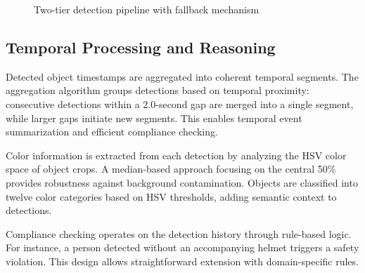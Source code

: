 \documentclass[12pt,a4paper]{article}
\begin{document}
\begin{figure}[H]
\centering
{}
\caption{Two-tier detection pipeline with fallback mechanism}
\label{fig:pipeline}
\end{figure}

\subsection{Temporal Processing and Reasoning}

Detected object timestamps are aggregated into coherent temporal segments. The aggregation algorithm groups detections based on temporal proximity: consecutive detections within a 2.0-second gap are merged into a single segment, while larger gaps initiate new segments. This enables temporal event summarization and efficient compliance checking.

Color information is extracted from each detection by analyzing the HSV color space of object crops. A median-based approach focusing on the central 50\% provides robustness against background contamination. Objects are classified into twelve color categories based on HSV thresholds, adding semantic context to detections.

Compliance checking operates on the detection history through rule-based logic. For instance, a person detected without an accompanying helmet triggers a safety violation. This design allows straightforward extension with domain-specific rules.
\end{document}
